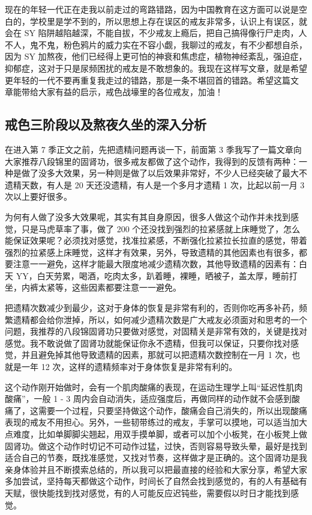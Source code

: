 \documentclass{ctexart}
\begin{document}
现在的年轻一代正在走我以前走过的弯路错路，因为中国教育在这方面可以说是空白的，学校里是学不到的，所以思想上存在误区的戒友非常多，认识上有误区，就会在 SY 陷阱越陷越深，不能自拔，不少戒友上瘾后，把自己搞得像行尸走肉，人不人，鬼不鬼，粉色鸦片的威力实在不容小觑，我聊过的戒友，有不少都想自杀，因为 SY 加熬夜，他们已经得上更可怕的神衰和焦虑症，植物神经紊乱，强迫症，抑郁症，这对于只是尿频困扰的戒友是不敢想象的。我现在这样写文章，就是希望更年轻的一代不要再重复我走过的错路，那是一条不堪回首的错路。希望这篇文 章能带给大家有益的启示，戒色战壕里的各位戒友，加油！

\subsection{戒色三阶段以及熬夜久坐的深入分析}

在进入第 7 季正文之前，先把遗精问题再谈一下，前面第 3 季我写了一篇文章向大家推荐八段锦里的固肾功，很多戒友都做了这个动作，我得到的反馈有两种：一种是做了没多大效果，另一种则是做了以后效果非常好，不少人已经突破了最大不遗精天数，有人是 20 天还没遗精，有人是一个多月才遗精 1 次，比起以前一月 3 次以上要好很多。

为何有人做了没多大效果呢，其实有其自身原因，很多人做这个动作并未找到感觉，只是马虎草率了事，做了 200 个还没找到强烈的拉紧感就上床睡觉了，怎么能保证效果呢？必须找对感觉，找准拉紧感，不断强化拉紧拉长拉直的感觉，带着强烈的拉紧感上床睡觉，这样才有效果，另外，导致遗精的其他因素也有很多，都要注意一一避免，这样才能最大限度地减少遗精次数，其他导致遗精的因素有：白天 YY，白天劳累，喝酒，吃肉太多，趴着睡，裸睡，晒被子，盖太厚，睡前打坐，内裤太紧等，这些因素都要注意一一避免。

把遗精次数减少到最少，这对于身体的恢复是非常有利的，否则你吃再多补药，频繁遗精都会给你泄掉，所以，如何减少遗精次数是广大戒友必须面对和思考的一个问题，我推荐的八段锦固肾功只要做对感觉，对固精关是非常有效的，关键是找对感觉。我不敢说做了固肾功就能保证你永不遗精，但我可以保证，只要你找对感觉，并且避免掉其他导致遗精的因素，那就可以把遗精次数控制在一月 1 次，也就是一年 12 次，这样的遗精频率对于身体恢复是非常有利的。

这个动作刚开始做时，会有一个肌肉酸痛的表现，在运动生理学上叫“延迟性肌肉酸痛”，一般 1 - 3 周内会自动消失，适应强度后，再做同样的动作就不会感到酸痛了，这需要一个过程，只要坚持做这个动作，酸痛会自己消失的，所以出现酸痛表现的戒友不用担心。另外，一些韧带练过的戒友，手掌可以摸地，可以适当加大点难度，比如单脚脚尖翘起，用双手摸单脚，或者可以加个小板凳，在小板凳上做固肾功。做这个动作时切记不可动作过猛，过快，否则容易导致头晕，最好是找到适合自己的节奏，既找准感觉，又找对节奏，这样做才是正确的。这个固肾功是我亲身体验并且不断摸索总结的，所以我可以把最直接的经验和大家分享，希望大家多加尝试，坚持每天都做这个动作，时间长了自然会找到感觉的，有的人有基础有天赋，很快能找到找对感觉，有的人可能反应迟钝些，需要假以时日才能找到感觉。
\end{document}
